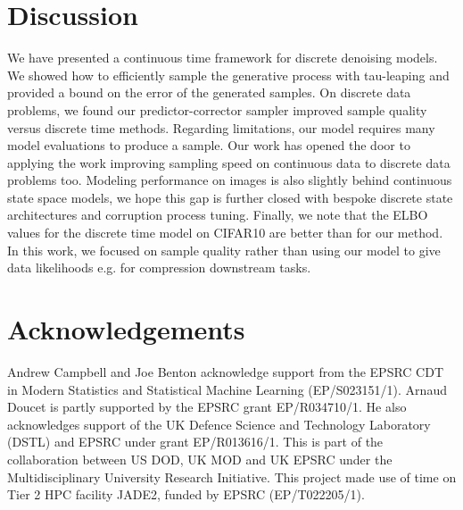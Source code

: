 \documentclass{article}
\begin{document}
\section{Discussion} \label{sec:Discussion}
We have presented a continuous time framework for discrete denoising models. We showed how to efficiently sample the generative process with tau-leaping and provided a bound on the error of the generated samples. On discrete data problems, we found our predictor-corrector sampler improved sample quality versus discrete time methods.
Regarding limitations, our model requires many model evaluations to produce a sample. Our work has opened the door to applying the work improving sampling speed on continuous data \cite{jolicoeur2021gotta, zhang2022fast, salimans2022progressive, chung2021come, bao2022analytic} to discrete data problems too. Modeling performance on images is also slightly behind continuous state space models, we hope this gap is further closed with bespoke discrete state architectures and corruption process tuning. Finally, we note that the ELBO values for the discrete time model on CIFAR10 are better than for our method. In this work, we focused on sample quality rather than using our model to give data likelihoods e.g. for compression downstream tasks.

\section*{Acknowledgements}
Andrew Campbell and Joe Benton acknowledge support from the EPSRC CDT in Modern Statistics and Statistical Machine Learning (EP/S023151/1). Arnaud Doucet is partly supported by the EPSRC grant EP/R034710/1. He also acknowledges support of the UK Defence Science and Technology Laboratory (DSTL) and EPSRC under grant EP/R013616/1. This is part of the collaboration between US DOD, UK MOD and UK EPSRC under the Multidisciplinary University Research Initiative. This project made use of time on Tier 2 HPC facility JADE2, funded by EPSRC (EP/T022205/1).





















\end{document}
